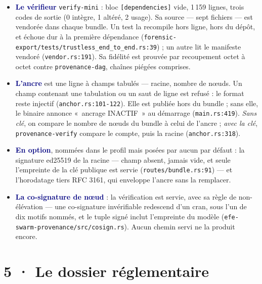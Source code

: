 \documentclass[10pt]{extarticle}
\newcommand{\code}[1]{\texttt{\small #1}}
\newcommand{\loc}[1]{{\footnotesize\color{grey}\texttt{#1}}}
\newcommand{\mm}[1]{\textbf{\textcolor{navy}{#1}}}
\begin{document}
\begin{itemize}[leftmargin=1.2em,itemsep=1.5pt,topsep=1pt]
\item \mm{Le vérifieur} \code{verify-mini} : bloc \code{[dependencies]} vide, 1\,159 lignes, trois codes de sortie
(0 intègre, 1 altéré, 2 usage). Sa source --- sept fichiers --- est vendorée dans chaque bundle. Un test la recompile
hors ligne, hors du dépôt, et échoue dur à la première dépendance
(\loc{forensic-export/\allowbreak tests/\allowbreak trustless\_end\_to\_end.rs:39}) ; un autre lit le manifeste vendoré
(\loc{vendor.rs:191}). Sa fidélité est prouvée par recoupement octet à octet contre \code{provenance-dag}, chaînes
piégées comprises.
\item \mm{L'ancre} est une ligne à champs tabulés --- racine, nombre de nœuds. Un champ contenant une tabulation ou un
saut de ligne est refusé : le format reste injectif (\loc{anchor.rs:101-122}). Elle est publiée hors du bundle ; sans
elle, le binaire annonce «~ancrage INACTIF~» au démarrage (\loc{main.rs:419}). \emph{Sans clé}, on compare le nombre
de nœuds du bundle à celui de l'ancre ; \emph{avec la clé}, \code{provenance-verify} compare le compte, puis la racine
(\loc{anchor.rs:318}).
\item \mm{En option}, nommées dans le profil mais posées par aucun par défaut : la signature ed25519 de la racine ---
champ absent, jamais vide, et seule l'empreinte de la clé publique est servie (\loc{routes/\allowbreak bundle.rs:91})
--- et l'horodatage tiers RFC 3161, qui enveloppe l'ancre sans la remplacer.
\item \mm{La co-signature de nœud} : la vérification est servie, avec sa règle de non-élévation --- une co-signature
invérifiable redescend d'un cran, sous l'un de dix motifs nommés, et le tuple signé inclut l'empreinte du modèle
(\loc{efe-swarm-provenance/\allowbreak src/\allowbreak cosign.rs}). Aucun chemin servi ne la produit encore.
\end{itemize}

\section{5 · Le dossier réglementaire}
\end{document}
